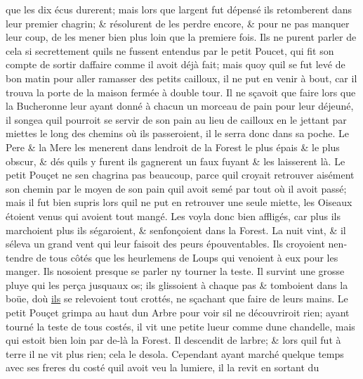 \documentclass[14pt,a4paper]{memoir}
\newcommand{\ul}[1]{\uline{#1}}
\begin{document}
\begin{otherlanguage}{french}
que les dix écus durerent; mais lors que l\textquotesingle argent fut
dépensé ils retomberent dans leur premier chagrin; \& résolurent de les
perdre encore, \& pour ne pas manquer leur coup, de les mener bien plus
loin que la premiere fois. Ils ne purent parler de cela si secrettement
qu\textquotesingle ils ne fussent entendus par le petit Poucet, qui fit
son compte de sortir d\textquotesingle affaire comme il avoit déjà fait;
mais quoy qu\textquotesingle il se fut levé de bon matin pour aller
ramasser des petits cailloux, il ne put en venir à bout, car il trouva
la porte de la maison fermée à double tour. Il ne sçavoit que faire lors
que la Bucheronne leur ayant donné à chacun un morceau de pain pour leur
déjeuné, il songea qu\textquotesingle il pourroit se servir de son pain
au lieu de cailloux en le jettant par miettes le long des chemins où ils
passeroient, il le serra donc dans sa poche. Le Pere \& la Mere les
menerent dans l\textquotesingle endroit de la Forest le plus épais \& le
plus obscur, \& dés qu\textquotesingle ils y furent ils gagnerent un
faux fuyant \& les laisserent là. Le petit Pouçet ne
s\textquotesingle en chagrina pas beaucoup, parce qu\textquotesingle il
croyait retrouver aisément son chemin par le moyen de son pain
qu\textquotesingle il avoit semé par tout où il avoit passé; mais il fut
bien supris lors qu\textquotesingle il ne put en retrouver une seule
miette, les Oiseaux étoient venus qui avoient tout mangé. Les voyla donc
bien affligés, car plus ils marchoient plus ils
s\textquotesingle égaroient, \& s\textquotesingle enfonçoient dans la
Forest. La nuit vint, \& il s\textquotesingle éleva un grand vent qui
leur faisoit des peurs épouventables. Ils croyoient
n\textquotesingle entendre de tous côtés que les heurlemens de Loups qui
venoient à eux pour les manger. Ils n\textquotesingle osoient presque se
parler ny tourner la teste. Il survint une grosse pluye qui les perça
jusqu\textquotesingle aux os; ils glissoient à chaque pas \& tomboient
dans la boüe, d\textquotesingle où \ul{ils} se relevoient tout crottés,
ne sçachant que faire de leurs mains. Le petit Pouçet grimpa au haut
d\textquotesingle un Arbre pour voir s\textquotesingle il ne
découvriroit rien; ayant tourné la teste de tous costés, il vit une
petite lueur comme d\textquotesingle une chandelle, mais qui estoit bien
loin par de-là la Forest. Il descendit de l\textquotesingle arbre; \&
lors qu\textquotesingle il fut à terre il ne vit plus rien; cela le
desola. Cependant ayant marché quelque temps avec ses freres du costé
qu\textquotesingle il avoit veu la lumiere, il la revit en sortant du

\end{otherlanguage}
\end{document}
